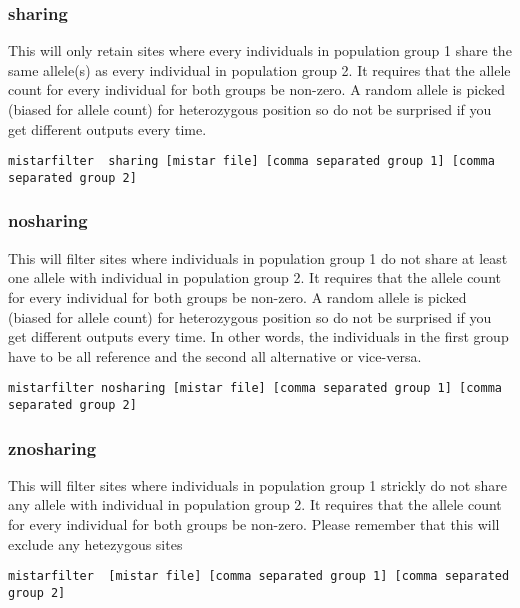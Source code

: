 \documentclass[a4paper]{article}
\begin{document}
\subsubsection{sharing}

This will only retain sites where every individuals in population group 1 share the same allele(s) as every individual in population group 2.
It requires that the allele count for every individual for both groups be non-zero.
A random allele is picked (biased for allele count) for heterozygous position so do not be surprised if you get different outputs every time.

\tiny
\begin{verbatim}
mistarfilter  sharing [mistar file] [comma separated group 1] [comma separated group 2]
\end{verbatim}
\normalsize

\subsubsection{nosharing}


This will filter sites where individuals in population group 1 do not share at least one allele with individual in population group 2.
It requires that the allele count for every individual for both groups be non-zero.
A random allele is picked (biased for allele count) for heterozygous position so do not be surprised if you get different outputs every time.
In other words, the individuals in the first group have to be all reference and the second all alternative or vice-versa.

\tiny
\begin{verbatim}
mistarfilter nosharing [mistar file] [comma separated group 1] [comma separated group 2]
\end{verbatim}
\normalsize

\subsubsection{znosharing}
This will filter sites where individuals in population group 1 strickly do not share any allele with individual in population group 2.
It requires that the allele count for every individual for both groups be non-zero.
Please remember that this will exclude any hetezygous sites

\small
\begin{verbatim}
mistarfilter  [mistar file] [comma separated group 1] [comma separated group 2]
\end{verbatim}
\normalsize
\end{document}
